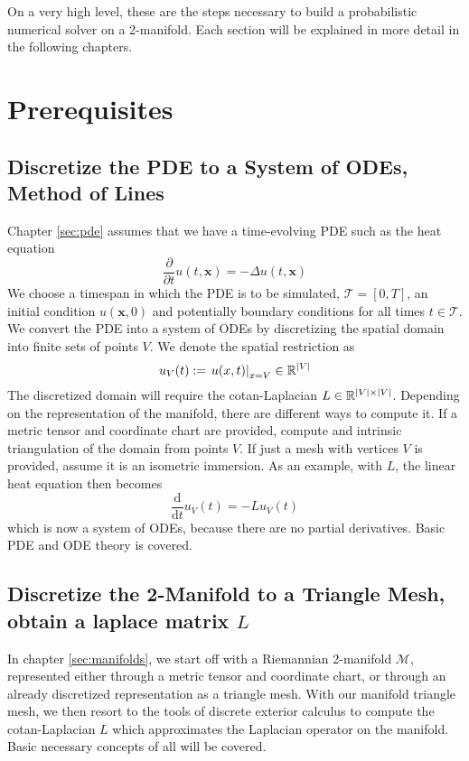\ifdefined\COMPILINGFROMMAIN
\else
    
    
\fi

On a very high level, these are the steps necessary to build a probabilistic numerical solver on a 2-manifold. Each section will be explained in more detail in the following chapters.

\section{Prerequisites}
\subsection*{Discretize the PDE to a System of ODEs, Method of Lines}
Chapter \ref{sec:pde} assumes that we have a time-evolving PDE such as the heat equation $$\frac{\partial}{\partial t}u(t,\mathbf{x}) = -\Delta u(t,\mathbf{x})$$ We choose a timespan in which the PDE is to be simulated, $\mathcal{T} = [0, T]$, an initial condition $u(\mathbf{x}, 0)$ and potentially boundary conditions for all times $t\in \mathcal{T}$. We convert the PDE into a system of ODEs by discretizing the spatial domain into finite sets of points $V$. We denote the spatial restriction as $$u_V(t) := \left . u(x,t)\right|_{x=V} \in \mathbb{R}^{|V|}$$ The discretized domain will require the cotan-Laplacian $L \in \mathbb{R}^{|V|\times |V|}$. Depending on the representation of the manifold, there are different ways to compute it.  If a metric tensor and coordinate chart are provided, compute and intrinsic triangulation of the domain from points $V$. If just a mesh with vertices $V$ is provided, assume it is an isometric immersion. As an example, with $L$, the linear heat equation then becomes $$\frac{\text{d}}{\text{d} t}u_V(t) = -Lu_V(t)$$ which is now a system of ODEs, because there are no partial derivatives. Basic PDE and ODE theory is covered.
\subsection*{Discretize the 2-Manifold to a Triangle Mesh, obtain a laplace matrix $L$}
In chapter \ref{sec:manifolds}, we start off with a Riemannian 2-manifold $\mathcal{M}$, represented either through a metric tensor and coordinate chart, or through an already discretized representation as a triangle mesh. With our manifold triangle mesh, we then resort to the tools of discrete exterior calculus to compute the cotan-Laplacian $L$ which approximates the Laplacian operator on the manifold. Basic necessary concepts of all will be covered.

